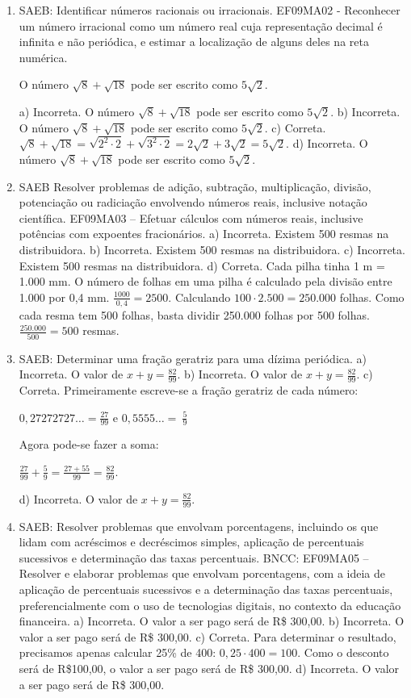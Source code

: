 \begin{enumerate}
\item
SAEB: Identificar números racionais ou irracionais. 
EF09MA02 - Reconhecer um número irracional como um número real cuja
representação decimal é infinita e não periódica, e estimar a localização
de alguns deles na reta numérica. 

O número $\sqrt{8} + \sqrt{18}$ pode ser escrito como $5\sqrt{2}$.

a) Incorreta. O número $\sqrt{8} + \sqrt{18}$ pode ser escrito 
como $5\sqrt{2}$. 
b) Incorreta. O número $\sqrt{8} + \sqrt{18}$ pode ser escrito 
como $5\sqrt{2}$. 
c) Correta. $\sqrt{8} + \sqrt{18} = \sqrt{2^{2} \cdot 2} + \sqrt{3^{2} \cdot 2} = 2\sqrt{2} + 3\sqrt{2} = 5\sqrt{2}.$
d) Incorreta. O número $\sqrt{8} + \sqrt{18}$ pode ser escrito 
como $5\sqrt{2}$.

\item
SAEB Resolver problemas de adição, subtração, multiplicação, divisão, potenciação ou radiciação envolvendo números reais, inclusive notação científica.
EF09MA03 -- Efetuar cálculos com números reais, inclusive potências com
expoentes fracionários.
a) Incorreta. Existem 500 resmas na distribuidora.
b) Incorreta. Existem 500 resmas na distribuidora.
c) Incorreta. Existem 500 resmas na distribuidora.
d) Correta. Cada pilha tinha 1 m = 1.000 mm. O número de folhas em
uma pilha é calculado pela divisão entre 1.000 por 0,4 mm.
$\frac{1000}{0,4} = 2500$. Calculando $100 \cdot 2.500 = 250.000$ folhas.
Como cada resma tem 500 folhas, basta dividir 250.000 folhas por 500
folhas. $\frac{250.000}{500} = 500$ resmas.

\item
SAEB: Determinar uma fração geratriz para uma dízima periódica.
a) Incorreta. O valor de $x + y = \frac{82}{99}$.
b) Incorreta. O valor de $x + y = \frac{82}{99}$.
c) Correta. Primeiramente escreve-se a fração geratriz de cada número:

$0,27272727\ldots{} = \frac{27}{99}$ e $0,5555\ldots{} = \ \frac{5}{9}$

Agora pode-se fazer a soma:

$\frac{27}{99} + \frac{5}{9} = \frac{27 + 55}{99} = \frac{82}{99}$.

d) Incorreta. O valor de $x + y = \frac{82}{99}$.

\item
SAEB: Resolver problemas que envolvam porcentagens, incluindo os
que lidam com acréscimos e decréscimos simples, aplicação de percentuais
sucessivos e determinação das taxas percentuais.
BNCC: EF09MA05 -- Resolver e elaborar problemas que envolvam
porcentagens, com a ideia de aplicação de percentuais sucessivos e a
determinação das taxas percentuais, preferencialmente com o uso de
tecnologias digitais, no contexto da educação financeira.
a) Incorreta. O valor a ser pago será de R\$ 300,00.
b) Incorreta. O valor a ser pago será de R\$ 300,00.
c) Correta. Para determinar o resultado, precisamos apenas calcular 
25\% de 400: $0,25 \cdot 400 = 100$. Como o desconto será de R\$100,00, 
o valor a ser pago será de R\$ 300,00.
d) Incorreta. O valor a ser pago será de R\$ 300,00.


\end{enumerate}
